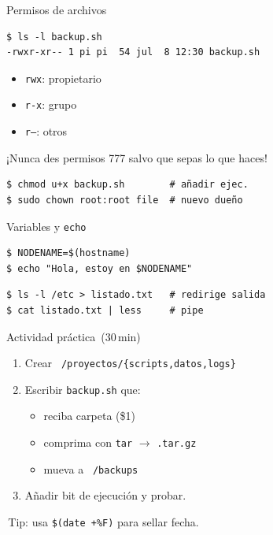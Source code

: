 \documentclass[aspectratio=169,professionalfonts]{beamer}
\begin{document}
\begin{frame}[fragile]{Permisos de archivos}
\begin{verbatim}
$ ls -l backup.sh
-rwxr-xr-- 1 pi pi  54 jul  8 12:30 backup.sh
\end{verbatim}

\begin{itemize}
  \item \texttt{rwx}: propietario
  \item \texttt{r-x}: grupo
  \item \texttt{r--}: otros
\end{itemize}

\begin{warnbox}
  ¡Nunca des permisos 777 salvo que sepas lo que haces!
\end{warnbox}

\begin{verbatim}
$ chmod u+x backup.sh        # añadir ejec.
$ sudo chown root:root file  # nuevo dueño
\end{verbatim}
\end{frame}

\begin{frame}[fragile]{Variables y \texttt{echo}}
\begin{verbatim}
$ NODENAME=$(hostname)
$ echo "Hola, estoy en $NODENAME"
\end{verbatim}

\begin{verbatim}
$ ls -l /etc > listado.txt   # redirige salida
$ cat listado.txt | less     # pipe
\end{verbatim}
\end{frame}

\begin{frame}{Actividad práctica (30 min)}
\begin{enumerate}
  \item Crear \texttt{~/proyectos/\{scripts,datos,logs\}}
  \item Escribir \texttt{backup.sh} que:
    \begin{itemize}
      \item reciba carpeta (\$1)
      \item comprima con \texttt{tar} \(\to\) \texttt{.tar.gz}
      \item mueva a \texttt{~/backups}
    \end{itemize}
  \item Añadir bit de ejecución y probar.
\end{enumerate}

\small\faLightbulb\; Tip: usa \texttt{\$(date +\%F)} para sellar fecha.
\end{frame}
\end{document}

